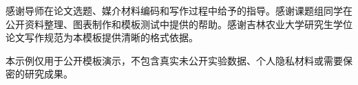 感谢导师在论文选题、媒介材料编码和写作过程中给予的指导。感谢课题组同学在公开资料整理、图表制作和模板测试中提供的帮助。感谢吉林农业大学研究生学位论文写作规范为本模板提供清晰的格式依据。

本示例仅用于公开模板演示，不包含真实未公开实验数据、个人隐私材料或需要保密的研究成果。
